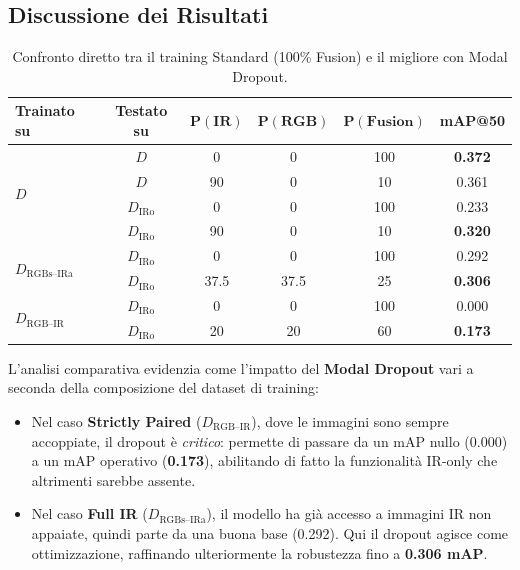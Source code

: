 \documentclass[a4paper,12pt]{article}
\begin{document}
\subsection*{Discussione dei Risultati}

\begin{table}[H]
\centering
\caption{Confronto diretto tra il training Standard (100\% Fusion) e il migliore con Modal Dropout.}
\label{tab:summary_comparison}
\begin{tabular}{l c c c c c}
\toprule
\textbf{Trainato su} & \textbf{Testato su} & $\boldsymbol{P(\text{IR})}$ & $\boldsymbol{P(\text{RGB})}$ & $\boldsymbol{P(\text{Fusion})}$ & \textbf{mAP@50} \\
\midrule
\multirow{4}{*}{$D$} 
 & $D$ & 0 & 0 & 100 & \textbf{0.372} \\
 & $D$ & 90 & 0 & 10 & 0.361 \\
 \cmidrule(l){2-6} 
 & $D_{\text{IRo}}$ & 0 & 0 & 100 & 0.233 \\
 & $D_{\text{IRo}}$ & 90 & 0 & 10 & \textbf{0.320} \\
\midrule
\multirow{2}{*}{$D_{\text{RGBs--IRa}}$} 
 & $D_{\text{IRo}}$ & 0 & 0 & 100 & 0.292 \\
 & $D_{\text{IRo}}$ & 37.5 & 37.5 & 25 & \textbf{0.306} \\
\midrule
\multirow{2}{*}{$D_{\text{RGB--IR}}$} 
 & $D_{\text{IRo}}$ & 0 & 0 & 100 & 0.000 \\
 & $D_{\text{IRo}}$ & 20 & 20 & 60 & \textbf{0.173} \\
\bottomrule
\end{tabular}
\end{table}

L'analisi comparativa evidenzia come l'impatto del \textbf{Modal Dropout} vari a seconda della composizione del dataset di training:

\begin{itemize}
    \item Nel caso \textbf{Strictly Paired} ($D_{\text{RGB--IR}}$), dove le immagini sono sempre accoppiate, il dropout è \textit{critico}: permette di passare da un mAP nullo (0.000) a un mAP operativo (\textbf{0.173}), abilitando di fatto la funzionalità IR-only che altrimenti sarebbe assente.
    \item Nel caso \textbf{Full IR} ($D_{\text{RGBs--IRa}}$), il modello ha già accesso a immagini IR non appaiate, quindi parte da una buona base (0.292). Qui il dropout agisce come ottimizzazione, raffinando ulteriormente la robustezza fino a \textbf{0.306 mAP}.
\end{itemize}
\end{document}
